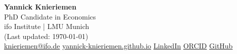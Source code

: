 \documentclass[a4paper,11pt]{article}
\begin{document}
\pagestyle{empty}

\begin{center}
    {\Huge \textbf{Yannick Knieriemen}}\\[0.3cm]
    {\large PhD Candidate in Economics}\\[0.1cm]
    {\large ifo Institute | LMU Munich}\\[0.2cm]
    {\small (Last updated: \today)}\\[0.4cm]
    
    \small
    \faEnvelope \hspace{1mm} \href{mailto:knieriemen@ifo.de}{knieriemen@ifo.de} \hspace{4mm}
    \faGlobe \hspace{1mm} \href{https://yannick-knieriemen.github.io}{yannick-knieriemen.github.io} \hspace{4mm}
    \faLinkedin \hspace{1mm} \href{https://www.linkedin.com/in/yannick-knieriemen}{LinkedIn} \hspace{4mm}
    \faOrcid \hspace{1mm} \href{https://orcid.org/0009-0002-8183-3700}{ORCID} \hspace{4mm}
    \faGithub \hspace{1mm} \href{https://github.com/yannick-knieriemen}{GitHub}
\end{center}
\end{document}
